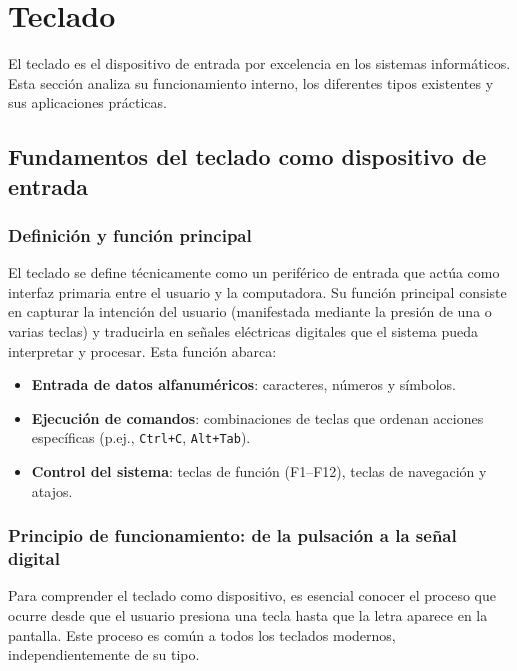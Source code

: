\documentclass[12pt, letterpaper]{article}
\begin{document}
\newpage
\section{Teclado}

El teclado es el dispositivo de entrada por excelencia en los sistemas informáticos. Esta sección analiza su funcionamiento interno, los diferentes tipos existentes y sus aplicaciones prácticas.

\subsection{Fundamentos del teclado como dispositivo de entrada}

\subsubsection{Definición y función principal}
El teclado se define técnicamente como un periférico de entrada que actúa como interfaz primaria entre el usuario y la computadora. Su función principal consiste en capturar la intención del usuario (manifestada mediante la presión de una o varias teclas) y traducirla en señales eléctricas digitales que el sistema pueda interpretar y procesar. Esta función abarca:
\begin{itemize}
    \item \textbf{Entrada de datos alfanuméricos}: caracteres, números y símbolos.
    \item \textbf{Ejecución de comandos}: combinaciones de teclas que ordenan acciones específicas (p.ej., \texttt{Ctrl+C}, \texttt{Alt+Tab}).
    \item \textbf{Control del sistema}: teclas de función (F1--F12), teclas de navegación y atajos.
\end{itemize}

\subsubsection{Principio de funcionamiento: de la pulsación a la señal digital}
Para comprender el teclado como dispositivo, es esencial conocer el proceso que ocurre desde que el usuario presiona una tecla hasta que la letra aparece en la pantalla. Este proceso es común a todos los teclados modernos, independientemente de su tipo.
\end{document}
